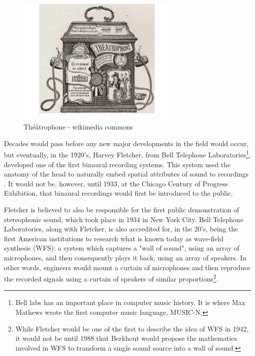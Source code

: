 \begin{figure}[h!]%
\centering
\includegraphics[width=0.7\textwidth]{img/theatrophone.jpeg} 
\label{fig:theatrophone}
\caption{Théâtrophone - wikimedia commons}
\end{figure}

Decades would pass before any new major developments in the field would occur, but eventually, in the 1920's, Harvey Fletcher, from Bell Telephone Laboratories\footnote{Bell labs has an important place in computer music history. It is where Max Mathews wrote the first computer music language, MUSIC-N.}, developed one of the first binaural recording systems. This system used the anatomy of the head to naturally embed spatial attributes of sound to recordings \cite{harvey1927binaural}. It would not be, however, until 1933, at the Chicago Century of Progress Exhibition, that binaural recordings would first be introduced to the public. 

Fletcher is believed to also be responsible for the first public demonstration of stereophonic sound, which took place in 1934 in New York City. Bell Telephone Laboratories, along with Fletcher, is also accredited for, in the 20's, being the first American institutions to research what is known today as wave-field synthesis (WFS): a system which captures a "wall of sound", using an array of microphones, and then consequently plays it back, using an array of speakers. In other words, engineers would mount a curtain of microphones and then reproduce the recorded signals using a curtain of speakers of similar proportions\cite{fletcher1942hearing}\footnote{While Fletcher would be one of the first to describe the idea of WFS in 1942, it would not be until 1988 that Berkhout would propose the mathematics involved in WFS to transform a single sound source into a wall of sound.}.

